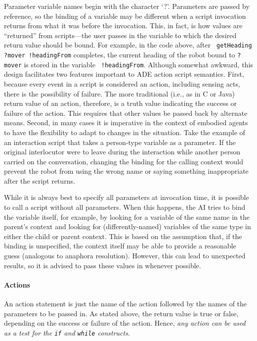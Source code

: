 \documentclass[11pt,letterpaper]{article}
\begin{document}
Parameter variable names begin with the character `?'.  Parameters are 
passed by reference, so the binding of a variable may be different 
when a script invocation returns from what it was before the 
invocation.  This, in fact, is how values are ``returned'' from 
scripts---the user passes in the variable to which the desired return 
value should be bound.  For example, in the code above, after {\tt 
getHeading ?mover !headingFrom} completes, the current heading of the 
robot bound to {\tt ?mover} is stored in the variable {\tt 
!headingFrom}.  Although somewhat awkward, this design facilitates two 
features important to ADE action script semantics.  First, because 
every event in a script is considered an action, including sensing 
acts, there is the possibility of failure.  The more traditional 
(i.e., as in C or Java) return value of an action, therefore, is a 
truth value indicating the success or failure of the action.  This 
requires that other values be passed back by alternate means.  Second, 
in many cases it is imperative in the context of embodied agents to 
have the flexibility to adapt to changes in the situation.  Take the 
example of an interaction script that takes a person-type variable as 
a parameter.  If the original interlocutor were to leave during the 
interaction while another person carried on the conversation, changing 
the binding for the calling context would prevent the robot from using 
the wrong name or saying something inappropriate after the script 
returns.

While it is always best to specify all parameters at invocation time, 
it is possible to call a script without all parameters.  When this 
happens, the AI tries to bind the variable itself, for example, by 
looking for a variable of the same name in the parent's context and 
looking for (differently-named) variables of the same type in either 
the child or parent context.  This is based on the assumption that, if 
the binding is unspecified, the context itself may be able to provide 
a reasonable guess (analogous to anaphora resolution).  However, this 
can lead to unexpected results, so it is advised to pass these values 
in whenever possible.

\paragraph{Actions} An action statement is just the name of the action 
followed by the names of the parameters to be passed in.  As stated 
above, the return value is true or false, depending on the success or 
failure of the action.  Hence, {\em any action can be used as a test for 
  the {\tt if} and {\tt while} constructs}.
\end{document}
